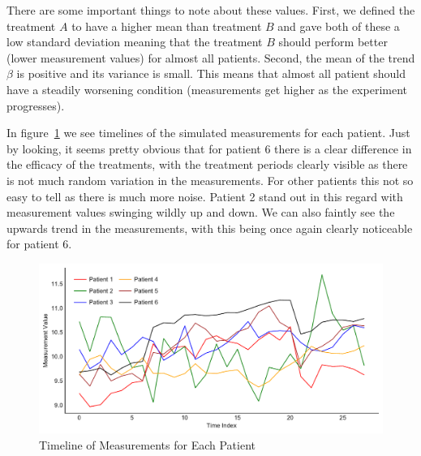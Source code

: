 \documentclass[12pt,a4paper,leqno]{report}
\theoremstyle{plain}
\theoremstyle{definition}
\theoremstyle{remark}
\begin{document}
There are some important things to note about these values. First, we defined the
treatment \(A\) to have a higher mean than treatment \(B\) and gave both of these a low
standard deviation meaning that the treatment \(B\) should perform better (lower
measurement values) for almost all patients.
Second, the mean of the trend \(\beta \) is positive and its variance is small. This means
that almost all patient should have a steadily worsening condition (measurements get
higher as the experiment progresses).

In figure\ \ref{measurementtimeline} we see timelines of the simulated measurements for
each patient. Just by looking, it seems
pretty obvious that for patient 6 there is a clear difference in the efficacy of the
treatments, with the treatment periods clearly visible as there is not much random
variation in the measurements. For other patients this not so
easy to tell as there is much more noise. Patient 2 stand out in this regard with
measurement values swinging wildly up and down.  We can also faintly see the upwards trend in the
measurements, with this being once again clearly noticeable for patient 6.

\begin{figure}[H]
    \caption{Timeline of Measurements for Each Patient}\label{measurementtimeline}
    \bigskip
    \includegraphics[width=\textwidth,height=\textheight,keepaspectratio]{measurements_timeline.pdf}
\end{figure}
\end{document}
